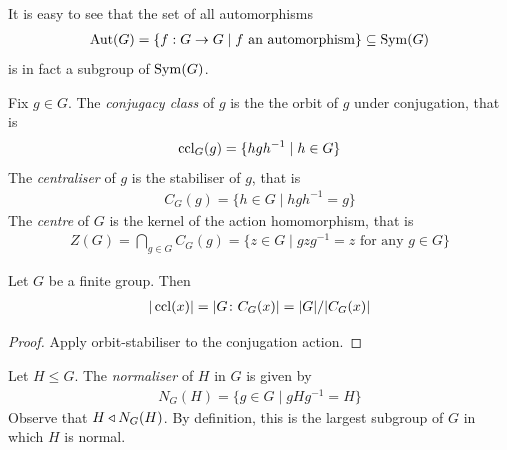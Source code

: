 \documentclass{../../template/note}
\begin{document}
    \begin{remark*}
        It is easy to see that the set of all automorphisms
        \begin{align*}
            \operatorname{Aut}(G) = \{f: G \to G \mid f \text{ an automorphism}\} \subseteq \operatorname{Sym}(G)
        \end{align*}
        is in fact a subgroup of $\operatorname{Sym}(G)$.        
    \end{remark*}
    
    \begin{definition}
        Fix $g \in G$. The \emph{conjugacy class} of $g$ is the the orbit of $g$ under conjugation, that is
        \begin{align*}
            \operatorname{ccl}_G(g) = \{hgh^{-1} \mid h \in G\}
        \end{align*}
        The \emph{centraliser} of $g$ is the stabiliser of $g$, that is
        \begin{align*}
            C_G(g) = \{h \in G \mid hgh^{-1} = g\}
        \end{align*}
        The \emph{centre} of $G$ is the kernel of the action homomorphism, that is
        \begin{align*}
            Z(G) = \bigcap_{g \in G} C_G(g) = \{z \in G \mid gzg^{-1} = z \text{ for any } g \in G\}
        \end{align*} 
    \end{definition}
    
    \begin{proposition}
        Let $G$ be a finite group. Then
        \begin{align*}
            |\operatorname{ccl}(x)| = |G\colon C_G(x)| = |G|/|C_G(x)|
        \end{align*}
    \end{proposition}
    
    \begin{proof}
        Apply orbit-stabiliser to the conjugation action.
    \end{proof}
    
    \begin{definition}[Normaliser]
        Let $H \leq G$. The \emph{normaliser} of $H$ in $G$ is given by
        \begin{align*}
            N_G(H) = \{g \in G \mid gHg^{-1} = H\}
        \end{align*}
        Observe that $H \triangleleft N_G(H)$. By definition, this is the largest subgroup of $G$ in which $H$ is normal.        
    \end{definition}
    
\end{document}
